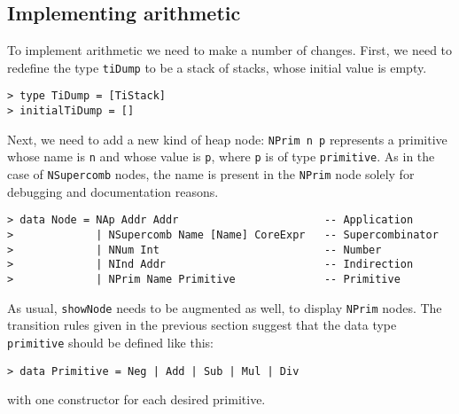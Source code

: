 \subsection{Implementing arithmetic}
\label{sect:templ:primitives-impl}

To implement arithmetic we need to make a number of changes.
First, we need to redefine the type \mbox{\tt tiDump} to be a stack of stacks, whose
initial value is empty.
\begin{verbatim}
> type TiDump = [TiStack]
> initialTiDump = []
\end{verbatim}
%
%
Next, we need to add a new kind of heap node:
\mbox{\tt NPrim\ n\ p} represents a primitive whose name is \mbox{\tt n} and
whose value is \mbox{\tt p}, where \mbox{\tt p} is of type \mbox{\tt primitive}.
As in the case of \mbox{\tt NSupercomb} nodes, the name is present in the
\mbox{\tt NPrim} node solely for debugging and documentation reasons.
\begin{verbatim}
> data Node = NAp Addr Addr                       -- Application
>             | NSupercomb Name [Name] CoreExpr   -- Supercombinator
>             | NNum Int                          -- Number
>             | NInd Addr                         -- Indirection
>             | NPrim Name Primitive              -- Primitive
\end{verbatim}
%
%
%
%
%
As usual, \mbox{\tt showNode} needs to be augmented as well, to display \mbox{\tt NPrim} nodes.
The transition rules given in the previous section suggest that
the data type \mbox{\tt primitive} should be defined like this:
\begin{verbatim}
> data Primitive = Neg | Add | Sub | Mul | Div
\end{verbatim}
%
%
%
%
%
with one constructor for each desired primitive.

